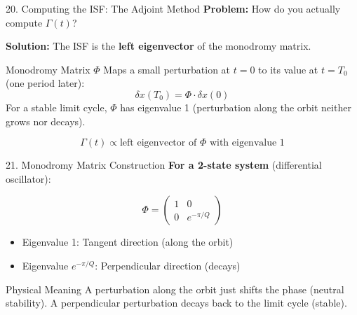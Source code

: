 \documentclass[aspectratio=169, 11pt]{beamer}
\begin{document}
\begin{frame}{20. Computing the ISF: The Adjoint Method}
    \textbf{Problem:} How do you actually compute $\Gamma(t)$?

    \vspace{0.5em}
    \textbf{Solution:} The ISF is the \textbf{left eigenvector} of the monodromy matrix.

    \vspace{0.5em}
    \begin{block}{Monodromy Matrix $\Phi$}
        Maps a small perturbation at $t=0$ to its value at $t=T_0$ (one period later):
        \[ \delta x(T_0) = \Phi \cdot \delta x(0) \]
        For a stable limit cycle, $\Phi$ has eigenvalue 1 (perturbation along the orbit neither grows nor decays).
    \end{block}

    \vspace{0.5em}
    \[ \Gamma(t) \propto \text{left eigenvector of } \Phi \text{ with eigenvalue } 1 \]
\end{frame}

\begin{frame}{21. Monodromy Matrix Construction}
    \textbf{For a 2-state system} (differential oscillator):

    \vspace{0.5em}
    \[ \Phi = \begin{pmatrix} 1 & 0 \\ 0 & e^{-\pi/Q} \end{pmatrix} \]

    \vspace{0.5em}
    \begin{itemize}
        \item Eigenvalue 1: Tangent direction (along the orbit)
        \item Eigenvalue $e^{-\pi/Q}$: Perpendicular direction (decays)
    \end{itemize}

    \vspace{0.5em}
    \begin{block}{Physical Meaning}
        A perturbation along the orbit just shifts the phase (neutral stability). A perpendicular perturbation decays back to the limit cycle (stable).
    \end{block}
\end{frame}
\end{document}
